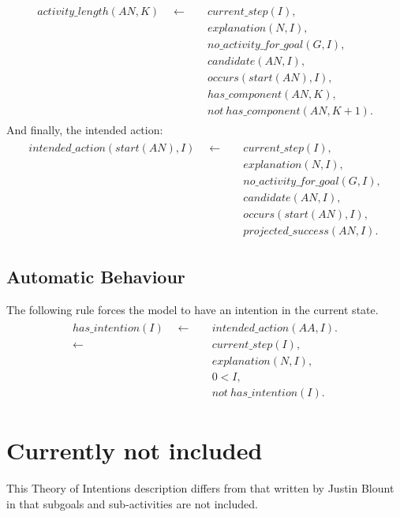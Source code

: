 \documentclass[11pt, oneside]{article}
\begin{document}
\begin{align}\begin{split}
activity\_length(AN,K) \quad \leftarrow \quad &current\_step(I),\\
&explanation(N,I),\\
&no\_activity\_for\_goal(G,I),\\
&candidate(AN,I),\\
&occurs(start(AN),I),\\
&has\_component(AN,K),\\
&not\ has\_component(AN,K+1).
\end{split}\end{align}
And finally, the intended action:
\begin{align}\begin{split}
intended\_action(start(AN),I)\quad \leftarrow \quad &current\_step(I),\\
&explanation(N,I),\\
&no\_activity\_for\_goal(G,I),\\
&candidate(AN,I),\\
&occurs(start(AN),I),\\
&projected\_success(AN,I).
\end{split}\end{align}

\subsection{Automatic Behaviour}
The following rule  forces the model to have an intention in the current state.
\begin{align}\begin{split}
has\_intention(I)\quad \leftarrow \quad &intended\_action(AA,I).\\
\leftarrow \quad &current\_step(I),\\ &explanation(N,I),\\&0<I,\\ &not\ has\_intention(I).
\end{split}\end{align}


\section{Currently not included}
This Theory of Intentions description differs from that written by Justin Blount in that subgoals and sub-activities are not included.
 
 
%
%
 
 
 
\end{document}
